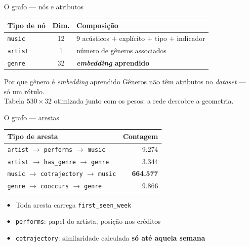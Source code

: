 \documentclass[aspectratio=169]{beamer}
\newcommand{\dest}[1]{\textcolor{ufprB}{\textbf{#1}}}
\begin{document}
\begin{frame}{O grafo --- nós e atributos}
  \begin{center}
  \begin{tabular}{lcp{6.0cm}}
  \toprule
  \textbf{Tipo de nó} & \textbf{Dim.} & \textbf{Composição} \\
  \midrule
  \texttt{music}  & 12 & 9 acústicos $+$ explícito $+$ tipo $+$ indicador \\
  \texttt{artist} & 1  & número de gêneros associados \\
  \texttt{genre}  & 32 & \dest{\emph{embedding} aprendido} \\
  \bottomrule
  \end{tabular}
  \end{center}
  \vfill
  \begin{block}{Por que gênero é \emph{embedding} aprendido}
    Gêneros não têm atributos no \emph{dataset} --- só um rótulo.\\
    Tabela $530\times32$ otimizada junto com os pesos: a rede descobre a geometria.
  \end{block}
  \vfill
\end{frame}

\begin{frame}{O grafo --- arestas}
  \begin{center}
  \begin{tabular}{lr}
  \toprule
  \textbf{Tipo de aresta} & \textbf{Contagem} \\
  \midrule
  \texttt{artist} $\to$ \texttt{performs} $\to$ \texttt{music}   & 9.274 \\
  \texttt{artist} $\to$ \texttt{has\_genre} $\to$ \texttt{genre} & 3.344 \\
  \texttt{music} $\to$ \texttt{cotrajectory} $\to$ \texttt{music} & \dest{664.577} \\
  \texttt{genre} $\to$ \texttt{cooccurs} $\to$ \texttt{genre}    & 9.866 \\
  \bottomrule
  \end{tabular}
  \end{center}
  \vfill
  \begin{itemize}
    \item Toda aresta carrega \texttt{first\_seen\_week}
    \item \texttt{performs}: papel do artista, posição nos créditos
    \item \texttt{cotrajectory}: similaridade calculada \dest{só até aquela semana}
  \end{itemize}
  \vfill
\end{frame}
\end{document}
